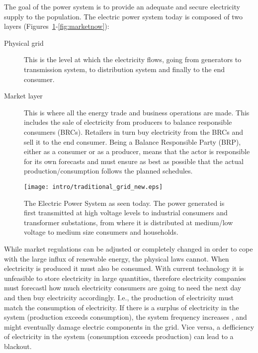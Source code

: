 The goal of the power system is to provide an adequate and secure electricity supply to the population.
The electric power system today is composed of two layers (Figures~\ref{fig:powernow}-\ref{fig:marketnow}): 
\begin{description}
	\item[Physical grid] This is the level at which the electricity flows, going from generators to transmission system, to distribution system and finally to the end consumer.
	\item[Market layer] This is where all the energy trade and business operations are made. This includes the sale of electricity from producers to balance responsible consumers (BRCs). Retailers in turn buy electricity from the BRCs and sell it to the end consumer. Being a Balance Responsible Party (BRP), either as a consumer or as a producer, means that the actor is responsible for its own forecasts and must ensure as best as possible that the actual production/consumption follows the planned schedules.
\end{description}

\begin{figure}[t]
	\centering
	\caption{The Electric Power System as seen today. The power generated is first transmitted at high voltage levels to industrial consumers and transformer substations, from where it is distributed at medium/low voltage to medium size consumers and households.}\label{fig:powernow}
	\texttt{[image: intro/traditional\_grid\_new.eps]}
\end{figure}

While market regulations can be adjusted or completely changed in order to cope with the large influx of renewable energy, the physical laws cannot.
When electricity is produced it must also be consumed. With current technology it is unfeasible to store electricity in large quantities, therefore electricity companies must forecastl how much electricity consumers are going to need the next day and then buy electricity accordingly. I.e., the production of electricity must match the consumption of electricity. If there is a surplus of electricity in the system (production exceeds consumption), the system frequency increases%
, and might eventually damage electric components in the grid. Vice versa, a defficiency of electricity in the system (consumption exceeds production) can lead to a blackout. 

